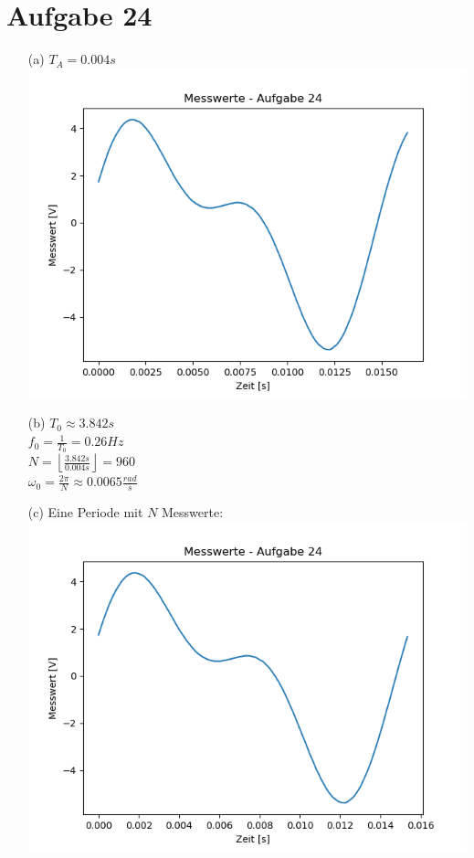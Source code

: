

	\section*{Aufgabe 24}
		\begin{itemize}
			\item[(a)] $T_A = 0.004s$\\
				\includegraphics[scale = 0.7]{A24_messPlot.png}
			\item[(b)] $T_0 \approx 3.842s $\\
			$f_0 = \frac{1}{T_0} = 0.26Hz$\\
			$N = \left\lfloor \frac{3.842s}{0.004s} \right\rfloor = 960$\\
			$\omega_0 = \frac{2\pi}{N} \approx 0.0065\frac{rad}{s}$
			\item[(c)] Eine Periode mit $N$ Messwerte:\\
				\includegraphics[scale = 0.7]{A24_messPlot_periode.png}

\end{itemize}
